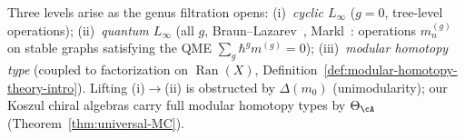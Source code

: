 \begin{remark}
\label{rem:quantum-vs-cyclic-linf}
Three levels arise as the genus filtration opens:
(i)~\emph{cyclic $L_\infty$} ($g = 0$, tree-level operations);
(ii)~\emph{quantum $L_\infty$} (all $g$, Braun--Lazarev~\cite{BL15},
Markl~\cite{Markl06}: operations $m^{(g)}_n$ on stable graphs
satisfying the QME $\sum_g \hbar^g m^{(g)} = 0$);
(iii)~\emph{modular homotopy type} (coupled to factorization on
$\operatorname{Ran}(X)$,
Definition~\ref{def:modular-homotopy-theory-intro}).
Lifting (i)$\to$(ii) is obstructed by $\Delta(m_0)$ (unimodularity);
our Koszul chiral algebras carry full modular homotopy types by
$\Theta_\cA$ (Theorem~\ref{thm:universal-MC}).
\end{remark}

